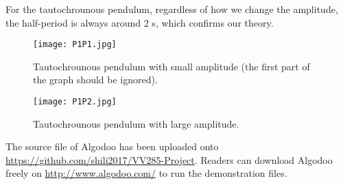 \documentclass{article}
\begin{document}
	\par For the tautochrounous pendulum, regardless of how we change the amplitude, the half-period is always around 2 s, which confirms our theory.
\begin{figure}[H]
\centering
\texttt{[image: P1P1.jpg]}
\caption{Tautochrounous pendulum with small amplitude (the first part of the graph should be ignored).}
\label{g5}
\end{figure}
\begin{figure}[H]
\centering
\texttt{[image: P1P2.jpg]}
\caption{Tautochrounous pendulum with large amplitude.}
\label{g6}
\end{figure}
	\par The source file of Algodoo has been uploaded onto \url{https://github.com/shili2017/VV285-Project}. Readers can download Algodoo freely on \url{http://www.algodoo.com/} to run the demonstration files.
\newpage 
\end{document}
